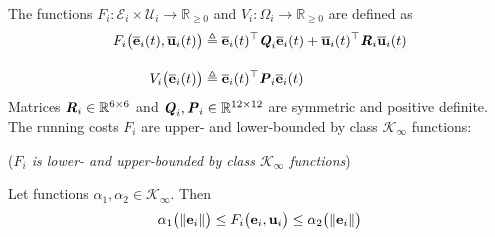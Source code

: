 


The functions
$F_i : \mathcal{E}_i \times \mathcal{U}_i \to \mathbb{R}_{\geq 0}$ and
$V_i: \Omega_i \to \mathbb{R}_{\geq 0}$ are defined as
\begin{align}
  F_i \big(\overline{\bm{\mathbf{e}}}_i(t), \overline{\bm{\mathbf{u}}}_i(t)\big)
  &\triangleq \overline{\bm{\mathbf{e}}}_i(t)^{\top} \bm{\mathit{Q}}_i \overline{\bm{\mathbf{e}}}_i(t) + \overline{\bm{\mathbf{u}}}_i(t)^{\top} \bm{\mathit{R}}_i \overline{\bm{\mathbf{u}}}_i(t)\\[2.5ex]
  V_i \big(\overline{\bm{\mathbf{e}}}_i(t)\big) & \triangleq \overline{\bm{\mathbf{e}}}_i(t)^{\top} \bm{\mathit{P}}_i \overline{\bm{\mathbf{e}}}_i(t)
\end{align}
Matrices $\bm{\mathit{R}}_i \in \mathbb{R}^{6 \times 6}$ and
$\bm{\mathit{Q}}_i, \bm{\mathit{P}}_i \in \mathbb{R}^{12 \times 12}$ are symmetric and positive
definite.  The running costs $F_i$ are upper- and lower-bounded by class
$\mathcal{K}_{\infty}$ functions:

\begin{bw_box}
  \begin{lemma} (\textit{$F_i$ is lower- and upper-bounded by class $\mathcal{K}_{\infty}$ functions})
    \label{lemma:F_i_bounded_K_class}

    Let functions $\alpha_1, \alpha_2 \in \mathcal{K}_{\infty}$. Then
    \begin{align}
      \alpha_1\big(\|\bm{\mathbf{e}}_i\|\big) \leq F_i\big(\bm{\mathbf{e}}_i, \bm{\mathbf{u}}_i\big) \leq \alpha_2\big(\| \bm{\mathbf{e}}_i \|\big)
    \end{align}
  \end{lemma}
\end{bw_box}

